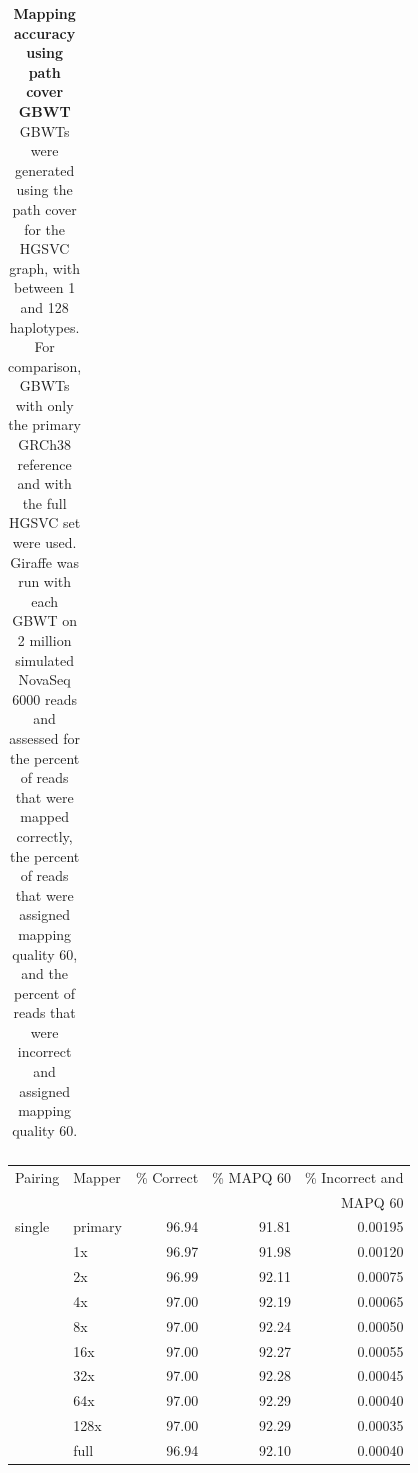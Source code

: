 \documentclass[11pt]{ucscthesis}
\begin{document}
\begin{table}[H]
\begin{tabular}{|l|l|r|r|r|}
        \hline
        
    \end{tabular}
    \caption[Mapping accuracy using path cover GBWT]{\textbf{Mapping accuracy using path cover GBWT} GBWTs were generated using the path cover for the HGSVC graph, with between 1 and 128 haplotypes. For comparison, GBWTs with only the primary GRCh38 reference and with the full HGSVC set were used. Giraffe was run with each GBWT on 2 million simulated NovaSeq 6000 reads and assessed for the percent of reads that were mapped correctly, the percent of reads that were assigned mapping quality 60, and the percent of reads that were incorrect and assigned mapping quality 60.}
    \label{tab:mapping_accuracy_hgsvc_cover_gbwt}
\end{table}

\begin{table}[H]
    \centering
    \begin{tabular}{|l|l|r|r|r|}
    \hline
        Pairing & Mapper & \% Correct & \% MAPQ 60 & \% Incorrect and \\
               &         &            &            & MAPQ 60          \\
        \hline
        single  & primary   & 96.94     & 91.81     & 0.00195 \\
                & 1x        & 96.97     & 91.98     & 0.00120 \\
                & 2x        & 96.99     & 92.11     & 0.00075 \\
                & 4x        & 97.00     & 92.19     & 0.00065 \\
                & 8x        & 97.00     & 92.24     & 0.00050 \\
                & 16x       & 97.00     & 92.27     & 0.00055 \\
                & 32x       & 97.00     & 92.28     & 0.00045 \\
                & 64x       & 97.00     & 92.29     & 0.00040 \\
                & 128x      & 97.00     & 92.29     & 0.00035 \\
                & full      & 96.94     & 92.10     & 0.00040 \\


\end{tabular}
\end{table}
\end{document}

